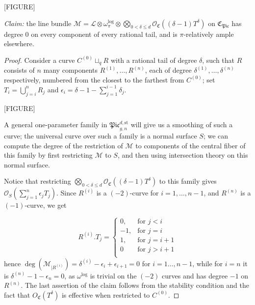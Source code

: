 [FIGURE]

\emph{Claim:} the line bundle $\mathcal M=\mathcal L\otimes\omega_{\pi}^{\text{log}}\otimes\bigotimes_{0<\delta\leq d}\mathcal O_{\mathfrak C}((\delta-1) T^\delta)$ on $\mathfrak{C}_{\mathfrak{Pic}}$ has degree 0 on every component of every rational tail, and is $\pi$-relatively ample elsewhere.

\begin{proof}

Consider a curve $C^{(0)}\sqcup_q R$ with a rational tail of degree $\delta$, such that $R$ consists of $n$ many components $R^{(1)
},\ldots,R^{(n)}$, each of degree $\delta^{(1)},\ldots,\delta^{(n)}$ respectively, numbered from the closest to the farthest from $C^{(0)}$; set $T_i=\bigcup_{j=i}^n R_j$ and $\epsilon_i=\delta-1-\sum_{j=1}^{i-1}\delta_j$.

[FIGURE]

A general one-parameter family in $\mathfrak{Pic}_{g,n}^{d,\text{st}}$ will give us a smoothing of such a curve; the universal curve over such a family is a normal surface $S$; we can compute the degree of the restriction of $\mathcal M$ to components of the central fiber of this family by first restricting $\mathcal M$ to $S$, and then using intersection theory on this normal surface.

Notice that restricting $\bigotimes_{0<\delta\leq d}\mathcal O_{\mathfrak C}((\delta-1) T^\delta)$ to this family gives $\mathcal O_S(\sum_{j=1}^n\epsilon_jT_j)$. Since $R^{(i)}$ is a $(-2)$-curve for $i=1,\ldots,n-1$, and $R^{(n)}$ is a $(-1)$-curve, we get

\[
  R^{(i)}.T_j =
  \begin{cases}
    0, & \text{for } j<i \\
    -1, & \text{for } j=i \\
    1, & \text{for } j=i+1 \\
    0 & \text{for } j>i+1 \\
  \end{cases}
\]
hence $\deg(\mathcal M_{|R^{(i)}})=\delta^{(i)}-\epsilon_i+\epsilon_{i+1}=0$ for $i=1\ldots,n-1$, while for $i=n$ it is $\delta^{(n)}-1-\epsilon_n=0$, as $\omega^{\text{log}}$ is trivial on the $(-2)$ curves and has degree $-1$ on $R^{(n)}$. The last assertion of the claim follows from the stability condition and the fact that $O_{\mathfrak C}(T^\delta)$ is effective when restricted to $C^{(0)}$.
\end{proof}

